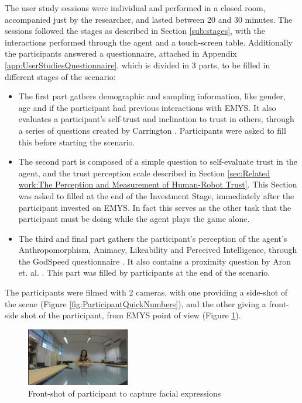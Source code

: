 The user study sessions were individual and performed in a closed room, accompanied just by the researcher, and lasted between 20 and 30 minutes. The sessions followed the stages as described in Section \ref{sub:stages}, with the interactions performed through the agent and a touch-screen table. Additionally the participants answered a questionnaire, attached in Appendix \ref{app:UserStudiesQuestionnaire}, which is divided in 3 parts, to be filled in different stages of the scenario: 

\begin{itemize}
    \item The first part gathers demographic and sampling information, like gender, age and if the participant had previous interactions with \ac{EMYS}. It also evaluates a participant's self-trust and inclination to trust in others, through a series of questions created by Carrington \cite{Carrington2007}. Participants were asked to fill this before starting the scenario.
    \item The second part is composed of a simple question to self-evaluate trust in the agent, and the trust perception scale described in Section \ref{sec:Related work:The Perception and Measurement of Human-Robot Trust}. This Section was asked to filled at the end of the Investment Stage, immediately after the participant invested on \ac{EMYS}. In fact this serves as the other task that the participant must be doing while the agent plays the game alone.
    \item The third and final part gathers the participant's perception of the agent's Anthropomorphism, Animacy, Likeability and Perceived Intelligence, through the GodSpeed questionnaire \cite{Bartneck2009,Lehmann2015}. It also contains a proximity question by Aron et. al. \cite{Aron1992}. This part was filled by participants at the end of the scenario.
\end{itemize}

The participants were filmed with 2 cameras, with one providing a side-shot of the scene (Figure \ref{fig:ParticipantQuickNumbers}), and the other giving a front-side shot of the participant, from \ac{EMYS} point of view (Figure \ref{fig:ScenarioFrontShot}).

\begin{figure}[hbt]
    \centering
    \includegraphics[width=0.4\textwidth]{figures/ScenarioFrontShot.png}
    \caption{Front-shot of participant to capture facial expressions}
    \label{fig:ScenarioFrontShot}
\end{figure}

